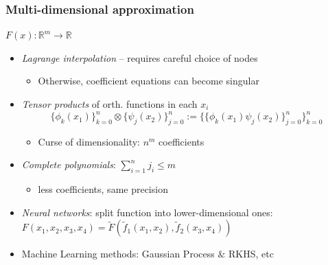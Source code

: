 \documentclass[bigger]{beamer}
\begin{document}
\begin{frame}%
\frametitle{Multi-dimensional approximation}

$F(x):\mathbb{R}^{m}\rightarrow \mathbb{R}$ 

\begin{itemize}
\item \emph{Lagrange interpolation} -- requires careful choice of nodes

\begin{itemize}
\item Otherwise, coefficient equations can become singular
\end{itemize}

\item \emph{Tensor products} of orth. functions in each $x_{i}$
\begin{equation*}
\{\phi_k(x_1)\}_{k=0}^{n}\otimes\{\psi_j(x_2)\}_{j=0}^{n}:=\{\{\phi_k(x_1)\psi_j(x_2)\}_{j=0}^{n}\}_{k=0}^{n}
\end{equation*}

\begin{itemize}
\item Curse of dimensionality: $n^{m}$ coefficients
\end{itemize}

\item \emph{Complete polynomials}: $\sum_{i=1}^{n}j_{i}\leq m$

\begin{itemize}
\item less coefficients, same precision
\end{itemize}

\item \emph{Neural networks}: split function into lower-dimensional ones:%
\newline
$F(x_{1},x_{2},x_{3},x_{4})=\tilde{F}(\tilde{f}_{1}(x_{1},x_{2}),\tilde{f}%
_{2}(x_{3},x_{4}))$

\item Machine Learning methods: Gaussian Process $\&$ RKHS, etc

\end{itemize}


\end{frame}%
\end{document}
